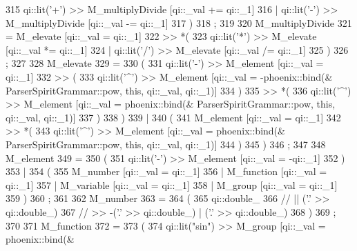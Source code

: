 \begin{DoxyCode}
315             qi::lit(\textcolor{charliteral}{'+'}) >> M\_multiplyDivide             [qi::\_val += qi::\_1]
316         |   qi::lit(\textcolor{charliteral}{'-'}) >> M\_multiplyDivide             [qi::\_val -= qi::\_1]
317         )
318         ;
319 
320     M\_multiplyDivide
321     =   M\_elevate                                        [qi::\_val = qi::\_1]
322         >> *(
323             qi::lit(\textcolor{charliteral}{'*'}) >> M\_elevate                    [qi::\_val *= qi::\_1]
324         |   qi::lit(\textcolor{charliteral}{'/'}) >> M\_elevate                    [qi::\_val /= qi::\_1]
325         )
326         ;
327 
328     M\_elevate
329     =
330         (
331             qi::lit(\textcolor{charliteral}{'-'}) >> M\_element                    [qi::\_val = qi::\_1]
332             >>  (
333                 qi::lit(\textcolor{charliteral}{'^'}) >> M\_element                [qi::\_val = -phoenix::bind(&
      ParserSpiritGrammar::pow, \textcolor{keyword}{this}, qi::\_val, qi::\_1)]
334             )
335             >> *(
336                 qi::lit(\textcolor{charliteral}{'^'}) >> M\_element                [qi::\_val = phoenix::bind(&
      ParserSpiritGrammar::pow, \textcolor{keyword}{this}, qi::\_val, qi::\_1)]
337             )
338         )
339         |
340         (
341             M\_element                                    [qi::\_val = qi::\_1]
342             >> *(
343                 qi::lit(\textcolor{charliteral}{'^'}) >> M\_element                [qi::\_val = phoenix::bind(&
      ParserSpiritGrammar::pow, \textcolor{keyword}{this}, qi::\_val, qi::\_1)]
344             )
345         )
346         ;
347 
348     M\_element
349     =
350         (
351             qi::lit(\textcolor{charliteral}{'-'}) >> M\_element                    [qi::\_val = -qi::\_1]
352         )
353         |
354         (
355             M\_number                                     [qi::\_val = qi::\_1]
356         |   M\_function                                   [qi::\_val = qi::\_1]
357         |   M\_variable                                   [qi::\_val = qi::\_1]
358         |   M\_group                                      [qi::\_val = qi::\_1]
359         )
360         ;
361 
362     M\_number
363     =
364         (
365             qi::double\_
366 \textcolor{comment}{//            ||   ('.' >> qi::double\_)}
367 \textcolor{comment}{//            >>   -('.' >> qi::double\_) | ('.' >> qi::double\_)}
368         )
369         ;
370 
371     M\_function
372     =
373         (
374             qi::lit(\textcolor{stringliteral}{"sin"})   >> M\_group                  [qi::\_val = phoenix::bind(&

\end{DoxyCode}
